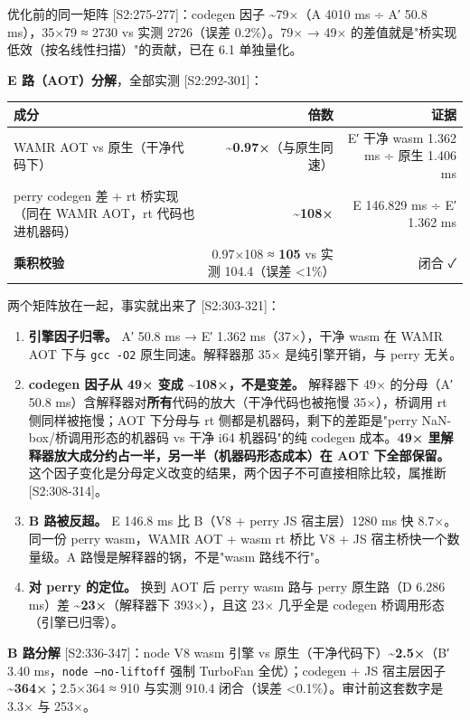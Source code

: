 \documentclass[11pt, a4paper]{article}
\begin{document}
优化前的同一矩阵 [S2:275-277]：codegen 因子 \textasciitilde{}79×（A 4010 ms ÷ A′ 50.8 ms），35×79 ≈ 2730 vs 实测 2726（误差 0.2\%）。79× → 49× 的差值就是"桥实现低效（按名线性扫描）"的贡献，已在 6.1 单独量化。


\textbf{E 路（AOT）分解}，全部实测 [S2:292-301]：


\begin{center}\small\begin{tabular}{lrr}
\toprule
成分 & 倍数 & 证据 \\
\midrule
WAMR AOT vs 原生（干净代码下） & \textbf{\textasciitilde{}0.97×}（与原生同速） & E′ 干净 wasm 1.362 ms ÷ 原生 1.406 ms \\
perry codegen 差 + rt 桥实现（同在 WAMR AOT，rt 代码也进机器码） & \textbf{\textasciitilde{}108×} & E 146.829 ms ÷ E′ 1.362 ms \\
\textbf{乘积校验} & 0.97×108 ≈ \textbf{105} vs 实测 104.4（误差 <1\%） & 闭合 ✓ \\
\bottomrule
\end{tabular}\end{center}


两个矩阵放在一起，事实就出来了 [S2:303-321]：


\begin{enumerate}
\item \textbf{引擎因子归零。} A′ 50.8 ms → E′ 1.362 ms（37×），干净 wasm 在 WAMR AOT 下与 \texttt{gcc -O2} 原生同速。解释器那 35× 是纯引擎开销，与 perry 无关。
\item \textbf{codegen 因子从 49× 变成 \textasciitilde{}108×，不是变差。} 解释器下 49× 的分母（A′ 50.8 ms）含解释器对\textbf{所有}代码的放大（干净代码也被拖慢 35×），桥调用 rt 侧同样被拖慢；AOT 下分母与 rt 侧都是机器码，剩下的差距是"perry NaN-box/桥调用形态的机器码 vs 干净 i64 机器码"的纯 codegen 成本。\textbf{49× 里解释器放大成分约占一半，另一半（机器码形态成本）在 AOT 下全部保留。} 这个因子变化是分母定义改变的结果，两个因子不可直接相除比较，属推断 [S2:308-314]。
\item \textbf{B 路被反超。} E 146.8 ms 比 B（V8 + perry JS 宿主层）1280 ms 快 8.7×。同一份 perry wasm，WAMR AOT + wasm rt 桥比 V8 + JS 宿主桥快一个数量级。A 路慢是解释器的锅，不是"wasm 路线不行"。
\item \textbf{对 perry 的定位。} 换到 AOT 后 perry wasm 路与 perry 原生路（D 6.286 ms）差 \textbf{\textasciitilde{}23×}（解释器下 393×），且这 23× 几乎全是 codegen 桥调用形态（引擎已归零）。
\end{enumerate}

\textbf{B 路分解} [S2:336-347]：node V8 wasm 引擎 vs 原生（干净代码下）\textbf{\textasciitilde{}2.5×}（B′ 3.40 ms，\texttt{node --no-liftoff} 强制 TurboFan 全优）；codegen + JS 宿主层因子 \textbf{\textasciitilde{}364×}；2.5×364 ≈ 910 与实测 910.4 闭合（误差 <0.1\%）。审计前这套数字是 3.3× 与 253×。
\end{document}
